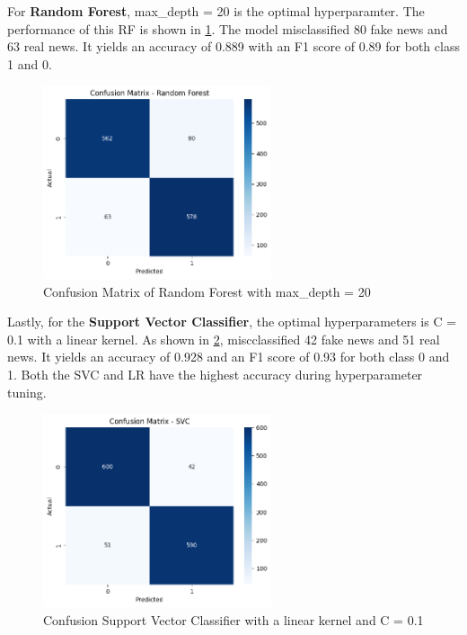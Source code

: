 For \textbf{Random Forest}, max\_depth = 20 is the optimal hyperparamter. The performance of this RF is shown in \ref{RF_hyperparam}. The model misclassified 80 fake news and 63 real news. It yields an accuracy of 0.889 with an F1 score of 0.89 for both class 1 and 0.

\begin{figure}[h!]
\centering
\includegraphics[width=0.6\textwidth,height=0.6\textheight, keepaspectratio]{figures/hyperparam/RF.png}
    \caption{Confusion Matrix of Random Forest with max\_depth = 20}
    \label{RF_hyperparam}
\end{figure}

Lastly, for the \textbf{Support Vector Classifier}, the optimal hyperparameters is C = 0.1 with a linear kernel. As shown in \ref{SVC_hyperparam}, miscclassified 42 fake news and 51 real news. It yields an accuracy of 0.928 and an F1 score of 0.93 for both class 0 and 1. Both the SVC and LR have the highest accuracy during hyperparameter tuning.

\begin{figure}[h!]
\centering
\includegraphics[width=0.6\textwidth,height=0.6\textheight, keepaspectratio]{figures/hyperparam/SVC.png}
    \caption{Confusion Support Vector Classifier with a linear kernel and C = 0.1}
    \label{SVC_hyperparam}
\end{figure}

